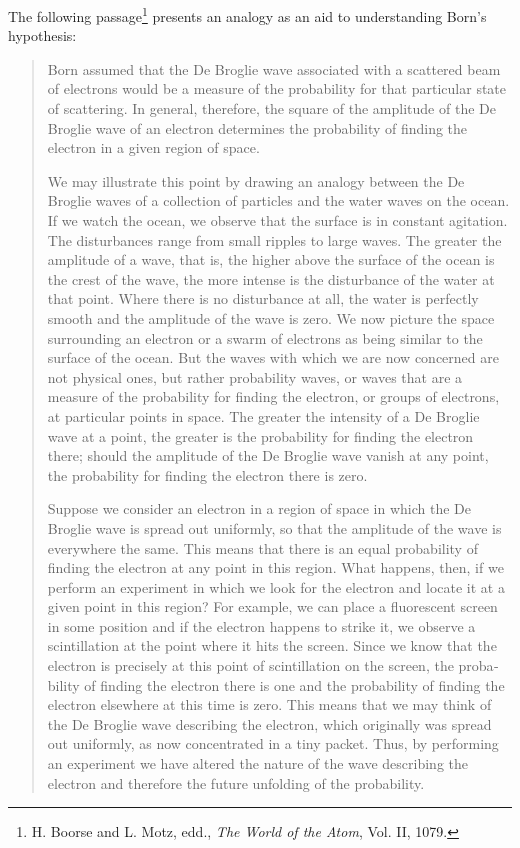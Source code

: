 The following passage\footnote{H. Boorse and L. Motz, edd., \emph{The
  World of the Atom}, Vol. II, 1079.} presents an analogy as an aid
to understanding Born's hypothesis:

\begin{quotation}
Born assumed that the De Broglie wave associated with a scattered beam
of electrons would be a measure of the probability for that particular
state of scattering. In general, therefore, the square of the amplitude
of the De Broglie wave of an electron determines the probability of
find­ing the electron in a given region of space.

We may illustrate this point by drawing an analogy between the De
Broglie waves of a collection of particles and the water waves on the
ocean. If we watch the ocean, we observe that the surface is in constant
agitation. The disturbances range from small ripples to large waves. The
greater the amplitude of a wave, that is, the higher above the surface
of the ocean is the crest of the wave, the more intense is the
disturbance of the water at that point. Where there is no disturbance at
all, the water is perfectly smooth and the amplitude of the wave is
zero. We now picture the space surrounding an electron or a swarm of
electrons as being similar to the surface of the ocean. But the waves
with which we are now con­cerned are not physical ones, but rather
probability waves, or waves that are a measure of the probability for
finding the electron, or groups of electrons, at particular points in
space. The greater the intensity of a De Broglie wave at a point, the
greater is the probability for finding the electron there; should the
amplitude of the De Broglie wave vanish at any point, the probability
for finding the electron there is zero.

Suppose we consider an electron in a region of space in which the De
Broglie wave is spread out uniformly, so that the amplitude of the wave
is everywhere the same. This means that there is an equal probability of
finding the electron at any point in this region. What happens, then, if
we perform an experiment in which we look for the electron and locate it
at a given point in this region? For example, we can place a fluorescent
screen in some position and if the electron happens to strike it, we
observe a scintillation at the point where it hits the screen. Since we
know that the electron is precisely at this point of scintillation on
the screen, the proba­bility of finding the electron there is one and
the probability of finding the electron elsewhere at this time is zero.
This means that we may think of the De Broglie wave describing the
electron, which originally was spread out uniformly, as now concentrated
in a tiny packet. Thus, by perform­ing an experiment we have altered the
nature of the wave describing the electron and therefore the future
unfolding of the probability.
\end{quotation}

